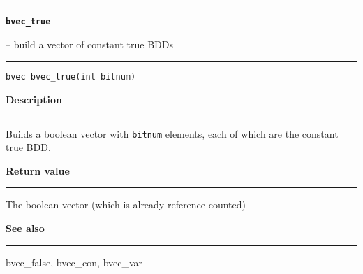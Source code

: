 \begin{minipage}{\textwidth}

\noindent\begin{minipage}{\textwidth}
\rule{\textwidth}{0.5mm}
{\tt\bf bvec\_true }
\--- build a vector of constant true BDDs  \hspace{\fill}
\\\rule[1.5ex]{\textwidth}{0.5mm}
\end{minipage}

\noindent\begin{verbatim}
bvec bvec_true(int bitnum) 
\end{verbatim}

\vspace{\parsep}\noindent
{\bf Description}\\\rule[1.5ex]{\textwidth}{0.2mm}\vspace{-1.5ex}\setlength{\parindent}{1em}
Builds a boolean vector with {\tt bitnum} elements, each of which
           are the constant true BDD. 

\setlength{\parindent}{0em}\vspace{\parsep}\vspace{\baselineskip}\noindent
{\bf Return value}\\\rule[1.5ex]{\textwidth}{0.2mm}\vspace{-1.5ex}
The boolean vector (which is already reference counted) 

\vspace{\parsep}\vspace{\baselineskip}\noindent
{\bf See also}\\\rule[1.5ex]{\textwidth}{0.2mm}\vspace{-1.5ex}
bvec\_false, bvec\_con, bvec\_var 
\end{minipage}
\vspace{8ex}
